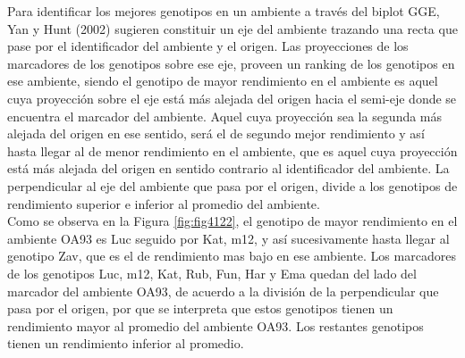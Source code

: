 \begin{itemize}[wide, nosep, labelindent = 0pt, topsep = 1ex, noitemsep,topsep=0pt]
Para identificar los mejores genotipos en un ambiente a través del biplot GGE, Yan y Hunt (2002) sugieren constituir un eje del ambiente trazando una recta que pase por el identificador del ambiente y el origen. Las proyecciones de los marcadores de los genotipos sobre ese eje, proveen un ranking de los genotipos en ese ambiente, siendo el genotipo de mayor rendimiento en el ambiente es aquel cuya proyección sobre el eje está más alejada del origen hacia el semi-eje donde se encuentra el marcador del ambiente. Aquel cuya proyección sea la segunda más alejada del origen en ese sentido, será el de segundo mejor rendimiento y así hasta llegar al de menor rendimiento en el ambiente, que es aquel cuya proyección está más alejada del origen en sentido contrario al identificador del ambiente. La perpendicular al eje del ambiente que pasa por el origen, divide a los genotipos de rendimiento superior e inferior al promedio del ambiente.\\
Como se observa en la Figura \ref{fig:fig4122}, el genotipo de mayor rendimiento en el ambiente OA93 es Luc seguido por Kat, m12, y así sucesivamente hasta llegar al genotipo Zav, que es el de rendimiento mas bajo en ese ambiente. Los marcadores de los genotipos Luc, m12, Kat, Rub, Fun, Har y Ema quedan del lado del marcador del ambiente OA93, de acuerdo a la división de la perpendicular que pasa por el origen, por que se interpreta que estos genotipos tienen un rendimiento mayor al promedio del ambiente OA93. Los restantes genotipos tienen un rendimiento inferior al promedio.\\ 


\end{itemize}
